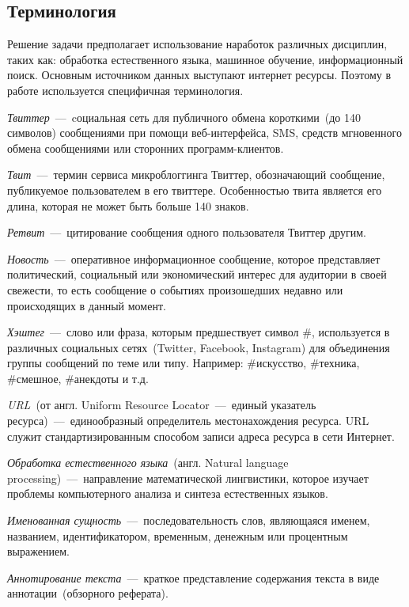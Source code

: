 \subsection{Терминология}
    Решение задачи предполагает использование наработок различных дисциплин, таких как: обработка естественного языка, машинное обучение, информационный поиск.
    Основным источником данных выступают интернет ресурсы.
    Поэтому в работе используется специфичная терминология.

    \textit{Твиттер}~---~cоциальная сеть для публичного обмена короткими~(до 140 символов) сообщениями при помощи веб-интерфейса, SMS,
    средств мгновенного обмена сообщениями или сторонних программ-клиентов.

    \textit{Твит}~---~термин сервиса микроблоггинга Твиттер, обозначающий сообщение, публикуемое пользователем в его твиттере.
    Особенностью твита является его длина, которая не может быть больше 140 знаков.

    \textit{Ретвит}~---~цитирование сообщения одного пользователя Твиттер другим.

    \textit{Новость}~---~оперативное информационное сообщение, которое представляет политический, социальный или экономический интерес для аудитории в своей свежести,
    то есть сообщение о событиях произошедших недавно или происходящих в данный момент.

    \textit{Хэштег}~---~слово или фраза, которым предшествует символ \#, используется в различных социальных сетях~(Twitter, Facebook, Instagram)
    для объединения группы сообщений по теме или типу.
    Например: \#искусство, \#техника, \#смешное, \#анекдоты и т.д.

    \textit{URL}~(от англ. Uniform Resource Locator~---~единый указатель ресурса)~---~единообразный определитель местонахождения ресурса.
    URL служит стандартизированным способом записи адреса ресурса в сети Интернет.

    \textit{Обработка естественного языка}~(англ. Natural language processing)~---~направление математической лингвистики,
    которое изучает проблемы компьютерного анализа и синтеза естественных языков.

    \textit{Именованная сущность}~---~последовательность слов, являющаяся именем, названием, идентификатором, временным, денежным или процентным выражением.

    \textit{Аннотирование текста}~---~краткое представление содержания текста в виде аннотации~(обзорного реферата).

